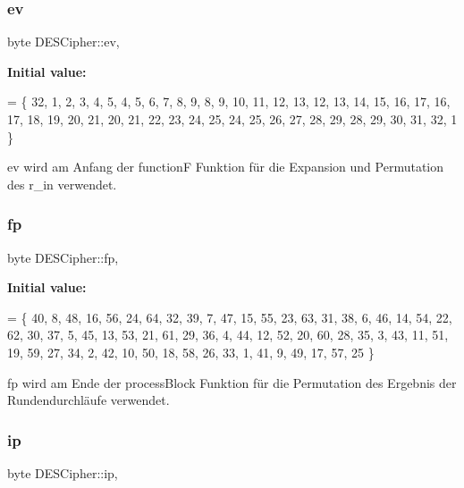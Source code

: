 \subsubsection{\texorpdfstring{ev}{ev}}
{\footnotesize\ttfamily byte D\+E\+S\+Cipher\+::ev\hspace{0.3cm}{\ttfamily [static]}, {\ttfamily [private]}}

{\bfseries Initial value\+:}
\begin{DoxyCode}
= \{
        32, 1, 2, 3, 4, 5,
        4, 5, 6, 7, 8, 9,
        8, 9, 10, 11, 12, 13,
        12, 13, 14, 15, 16, 17,
        16, 17, 18, 19, 20, 21,
        20, 21, 22, 23, 24, 25,
        24, 25, 26, 27, 28, 29,
        28, 29, 30, 31, 32, 1
\}
\end{DoxyCode}
ev wird am Anfang der functionF Funktion für die Expansion und Permutation des r\+\_\+in verwendet. \mbox{\label{classDESCipher_a4ed481831857615035c294e6a4fcee32}} 
\subsubsection{\texorpdfstring{fp}{fp}}
{\footnotesize\ttfamily byte D\+E\+S\+Cipher\+::fp\hspace{0.3cm}{\ttfamily [static]}, {\ttfamily [private]}}

{\bfseries Initial value\+:}
\begin{DoxyCode}
= \{
        40, 8, 48, 16, 56, 24, 64, 32,
        39, 7, 47, 15, 55, 23, 63, 31,
        38, 6, 46, 14, 54, 22, 62, 30,
        37, 5, 45, 13, 53, 21, 61, 29,
        36, 4, 44, 12, 52, 20, 60, 28,
        35, 3, 43, 11, 51, 19, 59, 27,
        34, 2, 42, 10, 50, 18, 58, 26,
        33, 1, 41, 9, 49, 17, 57, 25
\}
\end{DoxyCode}
fp wird am Ende der process\+Block Funktion für die Permutation des Ergebnis der Rundendurchläufe verwendet. \mbox{\label{classDESCipher_aa9e5743835ee06b59c6fad7cf954fde2}} 
\subsubsection{\texorpdfstring{ip}{ip}}
{\footnotesize\ttfamily byte D\+E\+S\+Cipher\+::ip\hspace{0.3cm}{\ttfamily [static]}, {\ttfamily [private]}}

